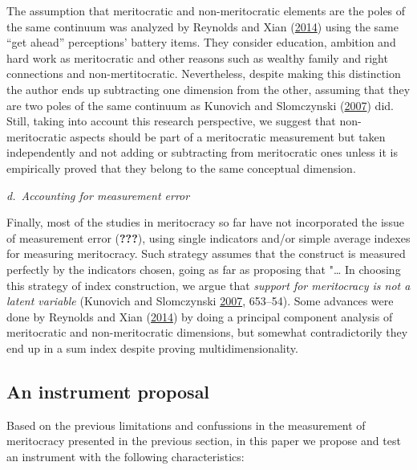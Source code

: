 \documentclass[
]{article}
\begin{document}
The assumption that meritocratic and non-meritocratic elements are the
poles of the same continuum was analyzed by Reynolds and Xian
(\protect\hyperlink{ref-reynolds_perceptions_2014}{2014}) using the same
``get ahead'' perceptions' battery items. They consider education,
ambition and hard work as meritocratic and other reasons such as wealthy
family and right connections and non-mertitocratic. Nevertheless,
despite making this distinction the author ends up subtracting one
dimension from the other, assuming that they are two poles of the same
continuum as Kunovich and Slomczynski
(\protect\hyperlink{ref-kunovich_systems_2007}{2007}) did. Still, taking
into account this research perspective, we suggest that non-meritocratic
aspects should be part of a meritocratic measurement but taken
independently and not adding or subtracting from meritocratic ones
unless it is empirically proved that they belong to the same conceptual
dimension.

\emph{d.~Accounting for measurement error}

Finally, most of the studies in meritocracy so far have not incorporated
the issue of measurement error ({\textbf{???}}), using single indicators
and/or simple average indexes for measuring meritocracy. Such strategy
assumes that the construct is measured perfectly by the indicators
chosen, going as far as proposing that "\ldots{} In choosing this
strategy of index construction, we argue that \emph{support for
meritocracy is not a latent variable} (Kunovich and Slomczynski
\protect\hyperlink{ref-kunovich_systems_2007}{2007}, 653--54). Some
advances were done by Reynolds and Xian
(\protect\hyperlink{ref-reynolds_perceptions_2014}{2014}) by doing a
principal component analysis of meritocratic and non-meritocratic
dimensions, but somewhat contradictorily they end up in a sum index
despite proving multidimensionality.

\hypertarget{an-instrument-proposal}{%
\subsection{An instrument proposal}\label{an-instrument-proposal}}

Based on the previous limitations and confussions in the measurement of
meritocracy presented in the previous section, in this paper we propose
and test an instrument with the following characteristics:
\end{document}
